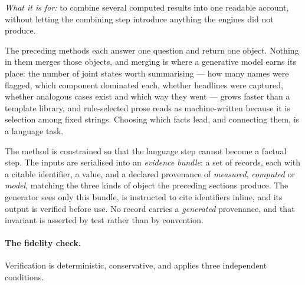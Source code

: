 \emph{What it is for:} to combine several computed results into one readable account, without letting
the combining step introduce anything the engines did not produce.

The preceding methods each answer one question and return one object. Nothing in them merges those
objects, and merging is where a generative model earns its place: the number of joint states worth
summarising --- how many names were flagged, which component dominated each, whether headlines were
captured, whether analogous cases exist and which way they went --- grows faster than a template
library, and rule-selected prose reads as machine-written because it is selection among fixed
strings. Choosing which facts lead, and connecting them, is a language task.

The method is constrained so that the language step cannot become a factual step. The inputs are
serialised into an \emph{evidence bundle}: a set of records, each with a citable identifier, a value,
and a declared provenance of \emph{measured}, \emph{computed} or \emph{model}, matching the three
kinds of object the preceding sections produce. The generator sees only this bundle, is instructed
to cite identifiers inline, and its output is verified before use. No record carries a
\emph{generated} provenance, and that invariant is asserted by test rather than by convention.

\paragraph{The fidelity check.} Verification is deterministic, conservative, and applies three
independent conditions.

